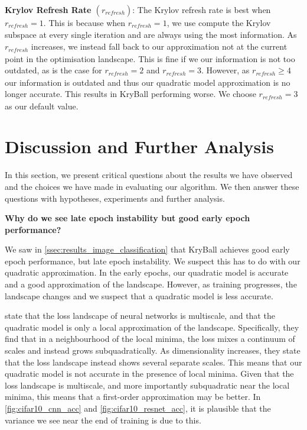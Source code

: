 \textbf{Krylov Refresh Rate $(r_{\mathit{refresh}})$}: The Krylov refresh rate is best when $r_{\mathit{refresh}} = 1$. This is because when $r_{\mathit{refresh}} = 1$, we use compute the Krylov subspace at every single iteration and are always using the most information. As $r_{\mathit{refresh}}$ increases, we instead fall back to our approximation not at the current point in the optimisation landscape. This is fine if we our information is not too outdated, as is the case for $r_{\mathit{refresh}} = 2$ and $r_{\mathit{refresh}} = 3$. However, as $r_{\mathit{refresh}} \geq 4$ our information is outdated and thus our quadratic model approximation is no longer accurate. This results in KryBall performing worse. We choose $r_{\mathit{refresh}} = 3$ as our default value.

\section{Discussion and Further Analysis}
\label{sec:discussion_and_further_analysis}

In this section, we present critical questions about the results we have observed and the choices we have made in evaluating our algorithm. We then answer these questions with hypotheses, experiments and further analysis. 

\textbf{Why do we see late epoch instability but good early epoch performance?}

We saw in \cref{ssec:results_image_classification} that KryBall achieves good early epoch performance, but late epoch instability. We suspect this has to do with our quadratic approximation. In the early epochs, our quadratic model is accurate and a good approximation of the landscape. However, as training progresses, the landscape changes and we suspect that a quadratic model is less accurate. 

\cite{ma2022beyond} state that the loss landscape of neural networks is multiscale, and that the quadratic model is only a local approximation of the landscape. Specifically, they find that in a neighbourhood of the local minima, the loss mixes a continuum of scales and instead grows subquadratically. As dimensionality increases, they state that the loss landscape instead shows several separate scales. This means that our quadratic model is not accurate in the presence of local minima. Given that the loss landscape is multiscale, and more importantly subquadratic near the local minima, this means that a first-order approximation may be better. In \cref{fig:cifar10_cnn_acc} and \cref{fig:cifar10_resnet_acc}, it is plausible that the variance we see near the end of training is due to this. 

